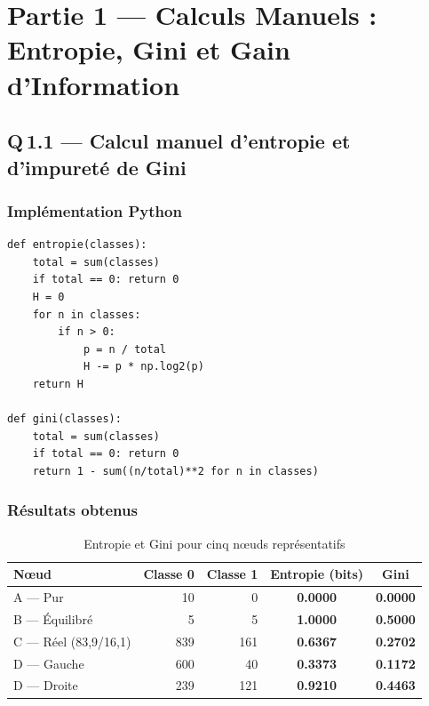 \documentclass[12pt,a4paper]{article}
\newcommand{\score}[1]{\textbf{#1}}
\begin{document}
\section{Partie 1 — Calculs Manuels : Entropie, Gini et Gain d'Information}

\subsection{Q\,1.1 — Calcul manuel d'entropie et d'impureté de Gini}

\subsubsection{Implémentation Python}

\begin{lstlisting}[caption={Fonctions de calcul d'entropie et de Gini}]
def entropie(classes):
    total = sum(classes)
    if total == 0: return 0
    H = 0
    for n in classes:
        if n > 0:
            p = n / total
            H -= p * np.log2(p)
    return H

def gini(classes):
    total = sum(classes)
    if total == 0: return 0
    return 1 - sum((n/total)**2 for n in classes)
\end{lstlisting}

\subsubsection{Résultats obtenus}

\begin{table}[H]
\centering
\caption{Entropie et Gini pour cinq nœuds représentatifs}
\begin{tabular}{lrrcc}
\toprule
\textbf{Nœud} & \textbf{Classe 0} & \textbf{Classe 1} & \textbf{Entropie (bits)} & \textbf{Gini} \\
\midrule
A — Pur                 & 10  & 0   & \score{0.0000} & \score{0.0000} \\
\rowcolor{rowalt}
B — Équilibré           & 5   & 5   & \score{1.0000} & \score{0.5000} \\
C — Réel (83,9/16,1)    & 839 & 161 & \score{0.6367} & \score{0.2702} \\
\rowcolor{rowalt}
D — Gauche              & 600 & 40  & \score{0.3373} & \score{0.1172} \\
D — Droite              & 239 & 121 & \score{0.9210} & \score{0.4463} \\
\bottomrule
\end{tabular}
\end{table}
\end{document}
